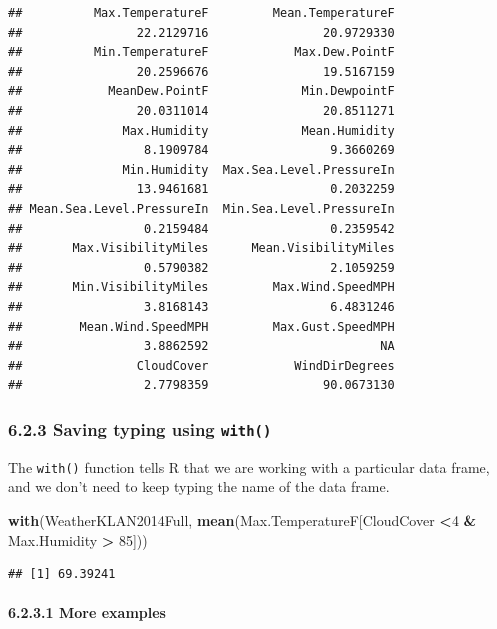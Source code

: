 \documentclass[]{article}
\newenvironment{Shaded}{\begin{snugshade}}{\end{snugshade}}
\newcommand{\KeywordTok}[1]{\textcolor[rgb]{0.13,0.29,0.53}{\textbf{#1}}}
\newcommand{\DecValTok}[1]{\textcolor[rgb]{0.00,0.00,0.81}{#1}}
\newcommand{\StringTok}[1]{\textcolor[rgb]{0.31,0.60,0.02}{#1}}
\newcommand{\OperatorTok}[1]{\textcolor[rgb]{0.81,0.36,0.00}{\textbf{#1}}}
\newcommand{\NormalTok}[1]{#1}
\let\oldparagraph\paragraph
\renewcommand{\paragraph}[1]{\oldparagraph{#1}\mbox{}}
\begin{document}
\begin{verbatim}
##          Max.TemperatureF         Mean.TemperatureF 
##                22.2129716                20.9729330 
##          Min.TemperatureF            Max.Dew.PointF 
##                20.2596676                19.5167159 
##            MeanDew.PointF             Min.DewpointF 
##                20.0311014                20.8511271 
##              Max.Humidity             Mean.Humidity 
##                 8.1909784                 9.3660269 
##              Min.Humidity  Max.Sea.Level.PressureIn 
##                13.9461681                 0.2032259 
## Mean.Sea.Level.PressureIn  Min.Sea.Level.PressureIn 
##                 0.2159484                 0.2359542 
##       Max.VisibilityMiles      Mean.VisibilityMiles 
##                 0.5790382                 2.1059259 
##       Min.VisibilityMiles         Max.Wind.SpeedMPH 
##                 3.8168143                 6.4831246 
##        Mean.Wind.SpeedMPH         Max.Gust.SpeedMPH 
##                 3.8862592                        NA 
##                CloudCover            WindDirDegrees 
##                 2.7798359                90.0673130
\end{verbatim}

\subsubsection{\texorpdfstring{6.2.3 Saving typing using
\texttt{with()}}{6.2.3 Saving typing using with()}}\label{saving-typing-using-with}

The \texttt{with()} function tells R that we are working with a
particular data frame, and we don't need to keep typing the name of the
data frame.

\begin{Shaded}
\begin{Highlighting}[]
\KeywordTok{with}\NormalTok{(WeatherKLAN2014Full, }\KeywordTok{mean}\NormalTok{(Max.TemperatureF[CloudCover }\OperatorTok{<}\DecValTok{4} \OperatorTok{&}\StringTok{ }\NormalTok{Max.Humidity }\OperatorTok{>}\StringTok{ }\DecValTok{85}\NormalTok{]))}
\end{Highlighting}
\end{Shaded}

\begin{verbatim}
## [1] 69.39241
\end{verbatim}

\paragraph{6.2.3.1 More examples}\label{more-examples}
\end{document}
